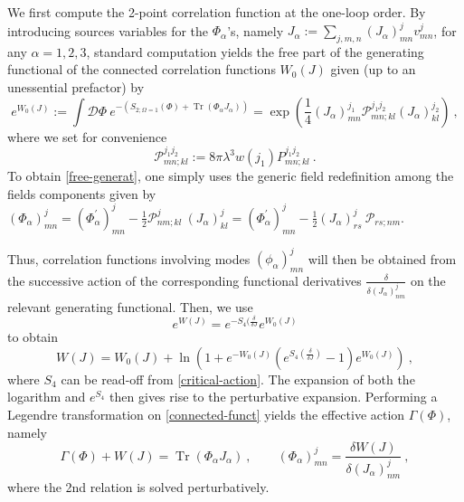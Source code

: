 \documentclass[a4paper,11pt,twoside]{article}
\numberwithin{equation}{section}
\DeclareMathOperator{\tr}{Tr}
\theoremstyle{nonumberplain}
\newcounter{and}
\begin{document}
We first compute the 2-point correlation function at the one-loop order. By introducing sources variables for the $\Phi_\alpha$'s, namely $J_\alpha:=\sum_{j,m,n}(J_\alpha)^j_{mn}v^j_{mn}$, for any $\alpha=1,2,3$, standard computation yields the free part of the generating functional of the connected correlation functions $W_0(J)$ given (up to an unessential prefactor) by%
%
\begin{equation}
e^{W_0(J)} := \int\mathcal{D}\Phi \ e^{-(S_{2;\Omega=1}(\Phi)+\tr(\Phi_\alpha J_\alpha))} 
= \exp\left(\frac{1}{4} (J_\alpha)^{j_1}_{mn} \mathcal{P}^{j_1j_2}_{mn;kl} (J_\alpha)^{j_2}_{kl} \right) \ , \label{free-generat}
\end{equation}
%
where we set for convenience%
%
\begin{equation}
\mathcal{P}^{j_1j_2}_{mn;kl} := 8\pi\lambda^3 w(j_1) P^{j_1j_2}_{mn;kl} \ . \label{source}
\end{equation}
To obtain \eqref{free-generat}, one simply uses the generic field redefinition among the fields components given by%
$(\Phi_\alpha)^j_{mn} = (\Phi^\prime_\alpha)_{mn}^j - \frac12 \mathcal{P}^j_{nm;kl}\ (J_\alpha)^j_{kl} = (\Phi^\prime_\alpha)_{mn}^j - \frac12 (J_\alpha)^j_{rs} \ \mathcal{P}_{rs;nm}$.\par%
%
Thus, correlation functions involving modes $(\phi_\alpha)^j_{mn}$ will then be obtained from the successive action of the corresponding functional derivatives $\frac{\delta}{\delta(J_\alpha)^j_{nm}}$ on the relevant generating functional. Then, we use%
%
\begin{equation*}
e^{W(J)} = e^{-S_4(\frac{\delta}{\delta{J}}} e^{W_0(J)}
\end{equation*}
%
to obtain%
\begin{equation}
W(J) = W_0(J) + \ln\left( 1 + e^{-W_0(J)} \left( e^{S_4\left(\frac{\delta}{\delta{J}}\right)} - 1 \right) e^{W_0(J)} \right) \ , \label{connected-funct}
\end{equation}
%
where $S_4$ can be read-off from \eqref{critical-action}. The expansion of both the logarithm and $e^{S_4}$ then gives rise to the perturbative expansion. Performing a Legendre transformation on \eqref{connected-funct} yields the effective action $\Gamma(\Phi)$, namely%
%
\begin{equation}
\Gamma(\Phi) + W(J) = \tr\left( \Phi_\alpha J_\alpha \right) \ , \qquad (\Phi_\alpha)^j_{mn} = \frac{\delta W(J)}{\delta(J_\alpha)^j_{nm}} \ , \label{legendre}
\end{equation}
%
where the 2nd relation is solved perturbatively.\par%
\end{document}

